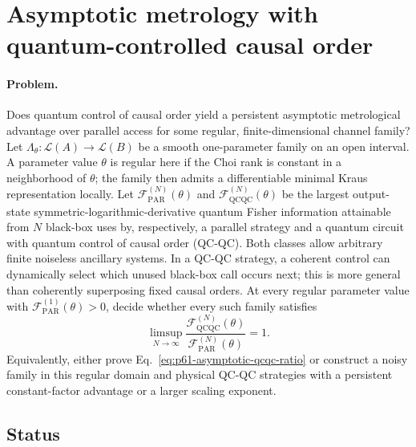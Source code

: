 \section{Asymptotic metrology with quantum-controlled causal order}
\label{sec:op_09b9fa91a1ac1a76}

\paragraph{Problem.}
Does quantum control of causal order yield a persistent asymptotic
metrological advantage over parallel access for some regular,
finite-dimensional channel family? Let
$\Lambda_\theta:\mathcal L(A)\to\mathcal L(B)$ be a smooth one-parameter
family on an open interval. A parameter value $\theta$ is regular here if
the Choi rank is constant in a neighborhood of $\theta$; the family then
admits a differentiable minimal Kraus representation locally.
Let $\mathcal F_{\mathrm{PAR}}^{(N)}(\theta)$ and
$\mathcal F_{\mathrm{QCQC}}^{(N)}(\theta)$ be the largest output-state
symmetric-logarithmic-derivative quantum Fisher information attainable from
$N$ black-box uses by, respectively, a parallel strategy and a quantum
circuit with quantum control of causal order (QC-QC). Both classes allow
arbitrary finite noiseless ancillary systems. In a QC-QC strategy, a
coherent control can dynamically select which unused black-box call occurs
next; this is more general than coherently superposing fixed causal
orders. At every regular parameter value with
$\mathcal F_{\mathrm{PAR}}^{(1)}(\theta)>0$, decide whether every such family
satisfies
\begin{equation}
  \limsup_{N\to\infty}
  \frac{\mathcal F_{\mathrm{QCQC}}^{(N)}(\theta)}
       {\mathcal F_{\mathrm{PAR}}^{(N)}(\theta)}
  =1.
  \label{eq:p61-asymptotic-qcqc-ratio}
\end{equation}
Equivalently, either prove Eq.~\eqref{eq:p61-asymptotic-qcqc-ratio} or
construct a noisy family in this regular domain and physical QC-QC
strategies with a persistent constant-factor advantage or a larger
scaling exponent.

\subsection*{Status}

